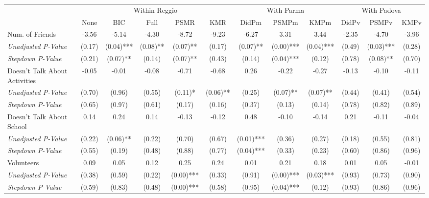 \begin{tabular}{l c c c c c c c c c c c}
\toprule
& \multicolumn{5}{c}{Within Reggio} & \multicolumn{3}{c}{With Parma} & \multicolumn{3}{c}{With Padova} \\\cmidrule(lr){2-6} \cmidrule(lr){7-9} \cmidrule(lr){10-12}
 & None & BIC & Full & PSMR & KMR & DidPm & PSMPm & KMPm & DidPv & PSMPv & KMPv \\
\midrule
Num. of Friends & -3.56 & -5.14 & -4.30 & -8.72 & -9.23 & -6.27 & 3.31 & 3.44 & -2.35 & -4.70 & -3.96 \\
\quad \textit{Unadjusted P-Value} & (0.17) & (0.04)*** & (0.08)** & (0.07)** & (0.17) & (0.07)** & (0.00)*** & (0.04)*** & (0.49) & (0.03)*** & (0.28) \\
\quad \textit{Stepdown P-Value} & (0.21) & (0.07)** & (0.14) & (0.07)** & (0.43) & (0.14) & (0.04)*** & (0.12) & (0.78) & (0.08)** & (0.70) \\
Doesn't Talk About Activities & -0.05 & -0.01 & -0.08 & -0.71 & -0.68 & 0.26 & -0.22 & -0.27 & -0.13 & -0.10 & -0.11 \\
\quad \textit{Unadjusted P-Value} & (0.70) & (0.96) & (0.55) & (0.11)* & (0.06)** & (0.25) & (0.07)** & (0.07)** & (0.44) & (0.41) & (0.54) \\
\quad \textit{Stepdown P-Value} & (0.65) & (0.97) & (0.61) & (0.17) & (0.16) & (0.37) & (0.13) & (0.14) & (0.78) & (0.82) & (0.89) \\
Doesn't Talk About School & 0.14 & 0.24 & 0.14 & -0.13 & -0.12 & 0.48 & -0.10 & -0.14 & 0.21 & -0.11 & -0.04 \\
\quad \textit{Unadjusted P-Value} & (0.22) & (0.06)** & (0.22) & (0.70) & (0.67) & (0.01)*** & (0.36) & (0.27) & (0.18) & (0.55) & (0.81) \\
\quad \textit{Stepdown P-Value} & (0.55) & (0.19) & (0.48) & (0.88) & (0.77) & (0.04)*** & (0.33) & (0.23) & (0.60) & (0.86) & (0.96) \\
Volunteers & 0.09 & 0.05 & 0.12 & 0.25 & 0.24 & 0.01 & 0.21 & 0.18 & 0.01 & 0.05 & -0.01 \\
\quad \textit{Unadjusted P-Value} & (0.38) & (0.59) & (0.22) & (0.00)*** & (0.33) & (0.91) & (0.00)*** & (0.03)*** & (0.93) & (0.73) & (0.90) \\
\quad \textit{Stepdown P-Value} & (0.59) & (0.83) & (0.48) & (0.00)*** & (0.58) & (0.95) & (0.04)*** & (0.12) & (0.93) & (0.86) & (0.96) \\
\bottomrule
\end{tabular}
